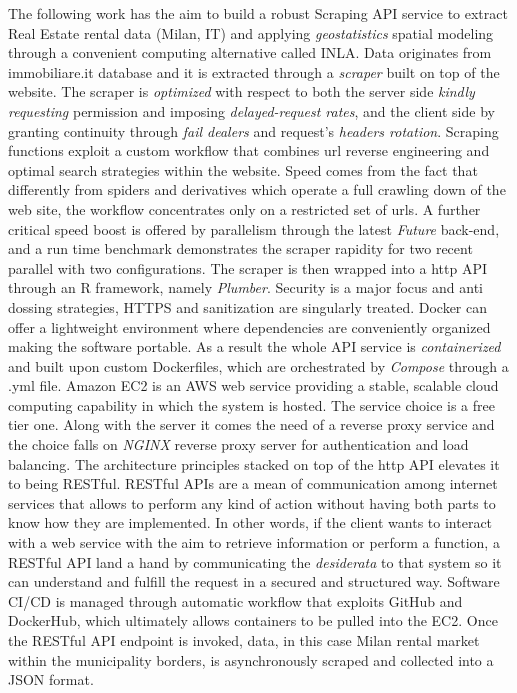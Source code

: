 \documentclass[
  12pt,
  a4paper,
  oneside]{book}
\theoremstyle{definition}
\theoremstyle{definition}
\theoremstyle{definition}
\theoremstyle{remark}
\begin{document}
The following work has the aim to build a robust Scraping API service to extract Real Estate rental data (Milan, IT) and applying \emph{geostatistics} spatial modeling through a convenient computing alternative called INLA.
Data originates from immobiliare.it database and it is extracted through a \emph{scraper} built on top of the website. The scraper is \emph{optimized} with respect to both the server side \emph{kindly requesting} permission and imposing \emph{delayed-request rates}, and the client side by granting continuity through \emph{fail dealers} and request's \emph{headers rotation}. Scraping functions exploit a custom workflow that combines url reverse engineering and optimal search strategies within the website. Speed comes from the fact that differently from spiders and derivatives which operate a full crawling down of the web site, the workflow concentrates only on a restricted set of urls. A further critical speed boost is offered by parallelism through the latest \emph{Future} back-end, and a run time benchmark demonstrates the scraper rapidity for two recent parallel with two configurations.
The scraper is then wrapped into a http API through an R framework, namely \emph{Plumber}. Security is a major focus and anti dossing strategies, HTTPS and sanitization are singularly treated.
Docker can offer a lightweight environment where dependencies are conveniently organized making the software portable. As a result the whole API service is \emph{containerized} and built upon custom Dockerfiles, which are orchestrated by \emph{Compose} through a .yml file. Amazon EC2 is an AWS web service providing a stable, scalable cloud computing capability in which the system is hosted. The service choice is a free tier one. Along with the server it comes the need of a reverse proxy service and the choice falls on \emph{NGINX} reverse proxy server for authentication and load balancing. The architecture principles stacked on top of the http API elevates it to being RESTful. RESTful APIs are a mean of communication among internet services that allows to perform any kind of action without having both parts to know how they are implemented.
In other words, if the client wants to interact with a web service with the aim to retrieve information or perform a function, a RESTful API land a hand by communicating the \emph{desiderata} to that system so it can understand and fulfill the request in a secured and structured way.
Software CI/CD is managed through automatic workflow that exploits GitHub and DockerHub, which ultimately allows containers to be pulled into the EC2. Once the RESTful API endpoint is invoked, data, in this case Milan rental market within the municipality borders, is asynchronously scraped and collected into a JSON format.
\end{document}
